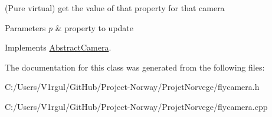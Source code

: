 (Pure virtual) get the value of that property for that camera 


\begin{DoxyParams}{Parameters}
{\em p} & property to update \\
\hline
\end{DoxyParams}


Implements \hyperlink{class_abstract_camera_acb48ab701cd02e78604a3ca1c695b1cf}{Abstract\-Camera}.



The documentation for this class was generated from the following files\-:\begin{DoxyCompactItemize}
\item 
C\-:/\-Users/\-V1rgul/\-Git\-Hub/\-Project-\/\-Norway/\-Projet\-Norvege/flycamera.\-h\item 
C\-:/\-Users/\-V1rgul/\-Git\-Hub/\-Project-\/\-Norway/\-Projet\-Norvege/flycamera.\-cpp\end{DoxyCompactItemize}
